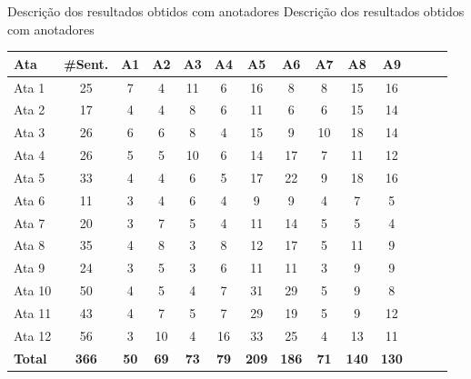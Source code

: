 \documentclass[xcolor=table]{beamer}
\begin{document}
\begin{frame}{Descrição dos resultados obtidos com anotadores}
	\center Descrição dos resultados obtidos com anotadores
\tiny
\begin{table}[!h]
	\centering


	\begin{tabular}{|l|c|c|c|c|c|c|c|c|c|c|c|c|c|} \hline
		\textbf{Ata} & \textbf{\#Sent.}  & \textbf{A1}  & \textbf{A2}  & \textbf{A3}  & \textbf{A4}  & \textbf{A5}  & \textbf{A6}  & \textbf{A7}  & \textbf{A8}  & \textbf{A9} \\	\hline
		Ata 1  & 25 & 7  & 4  & 11 & 6  & 16 & 8  & 8  & 15 & 16 \\ \hline 
		Ata 2  & 17 & 4  & 4  & 8  & 6  & 11 & 6  & 6  & 15 & 14 \\ \hline 
		Ata 3  & 26 & 6  & 6  & 8  & 4  & 15 & 9  & 10 & 18 & 14 \\ \hline 
		Ata 4  & 26 & 5  & 5  & 10 & 6  & 14 & 17 & 7  & 11 & 12 \\ \hline 
		Ata 5  & 33 & 4  & 4  & 6  & 5  & 17 & 22 & 9  & 18 & 16 \\ \hline 
		Ata 6  & 11 & 3  & 4  & 6  & 4  & 9  & 9  & 4  & 7  &  5 \\ \hline 
		Ata 7  & 20 & 3  & 7  & 5  & 4  & 11 & 14 & 5  & 5  &  4 \\ \hline 
		Ata 8  & 35 & 4  & 8  & 3  & 8  & 12 & 17 & 5  & 11 &  9 \\ \hline 
		Ata 9  & 24 & 3  & 5  & 3  & 6  & 11 & 11 & 3  & 9  &  9 \\ \hline 
		Ata 10 & 50 & 4  & 5  & 4  & 7  & 31 & 29 & 5  & 9  &  8 \\ \hline 
		Ata 11 & 43 & 4  & 7  & 5  & 7  & 29 & 19 & 5  & 9  & 12 \\ \hline 
		Ata 12 & 56 & 3  & 10 & 4  & 16 & 33 & 25 & 4  & 13 & 11 \\ \hline 
		\textbf{Total} & \textbf{366} & \textbf{50}&  \textbf{69} & \textbf{73}&  \textbf{79}&  \textbf{209} & \textbf{186}&  \textbf{71}&  \textbf{140}&  \textbf{130} \\ \hline 

	\end{tabular}

\end{table}


\end{frame}
\end{document}
